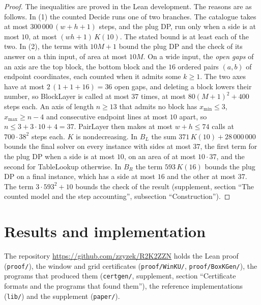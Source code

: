 \documentclass[11pt]{article}
\makeatletter
\newcommand{\lean}[1]{\texttt{#1}}
\newcommand{\secmark}[1]{\pdfsavepos\protected@write\@auxout{}{\string\secpos{#1}{\thepage}{\noexpand\the\noexpand\pdflastypos}}}
\def\secpos#1#2#3{}
\makeatother
\begin{document}
\begin{proof}
The inequalities are proved in the Lean development. The reasons are as follows. In (1) the
counted Decide runs one of two branches. The catalogue takes at most $300\,000\,(w+h+1)$ steps, and
the plug DP, run only when a side is at most $10$, at most $(wh+1)\,K(10)$. The stated bound is at
least each of the two. In (2), the terms with
$10M+1$ bound the plug DP and the check of its answer on a thin input, of area at most $10M$. On a
wide input, the \emph{open gaps} of an axis are the top block, the bottom block and the $16$ ordered
pairs $(a,b)$ of endpoint coordinates, each counted when it admits some $k\ge 1$. The two axes have at most $2\,(1+1+16)=36$ open gaps, and deleting a block lowers their
number, so BlockLayer is called at most $37$ times, at most $80(M+1)^2+400$ steps each. An axis
of length $n\ge 13$ that admits no block has $x_{\min}\le 3$, $x_{\max}\ge n-4$ and consecutive
endpoint lines at most $10$ apart, so $n\le 3+3\cdot 10+4=37$. PairLayer then makes at most $w+h\le 74$
calls at $700\cdot 38^2$ steps each. $K$ is nondecreasing. In $B_L$ the sum
$371\,K(10)+28\,000\,000$ bounds the final solver on every instance with sides at most $37$, the
first term for the plug DP when a side is at most $10$, on an area of at most $10\cdot 37$, and the
second for TableLookup otherwise. In $B_R$ the term $593\,K(16)$ bounds the plug DP on a final
instance, which has a side at most $16$ and the other at most $37$. The term $3\cdot 593^2+10$
bounds the check of the result (supplement, section ``The counted model and the step accounting'', subsection
``Construction'').
\end{proof}

\secmark{results}
\section{Results and implementation}\label{sec:results}

The repository \url{https://github.com/zzyzek/R2K2ZZN} holds the Lean proof (\lean{proof/}), the
window and grid certificates (\lean{proof/WinKU/}, \lean{proof/BoxKGen/}), the programs that
produced them (\lean{certgen/}, supplement, section ``Certificate formats and the programs that
found them''), the reference implementations (\lean{lib/}) and the supplement (\lean{paper/}).
\end{document}

